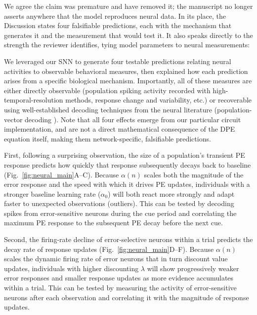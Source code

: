 We agree the claim was premature and have removed it; the manuscript no longer asserts anywhere that the model reproduces neural data. In its place, the Discussion states four falsifiable predictions, each with the mechanism that generates it and the measurement that would test it. It also speaks directly to the strength the reviewer identifies, tying model parameters to neural measurements:

\begin{ms}
We leveraged our SNN to generate four testable predictions relating neural activities to observable behavioral measures, then explained how each prediction arises from a specific biological mechanism. Importantly, all of these measures are either directly observable (population spiking activity recorded with high-temporal-resolution methods, response change and variability, etc.) or recoverable using well-established decoding techniques from the neural literature (population-vector decoding \citep{georgopoulos1986neuronal, wu2006bayesian}). Note that all four effects emerge from our particular circuit implementation, and are not a direct mathematical consequence of the DPE equation itself, making them network-specific, falsifiable predictions.

First, following a surprising observation, the size of a population's transient PE response predicts how quickly that response subsequently decays back to baseline (Fig.~\ref{fig:neural_main}A--C). Because $\alpha(n)$ scales both the magnitude of the error response and the speed with which it drives PE updates, individuals with a stronger baseline learning rate ($\alpha_0$) will both react more strongly and adapt faster to unexpected observations (outliers). This can be tested by decoding spikes from error-sensitive neurons during the cue period and correlating the maximum PE response to the subsequent PE decay before the next cue.

Second, the firing-rate decline of error-selective neurons within a trial predicts the decay rate of response updates (Fig.~\ref{fig:neural_main}D--F). Because $\alpha(n)$ scales the dynamic firing rate of error neurons that in turn discount value updates, individuals with higher discounting $\lambda$ will show progressively weaker error responses and smaller response updates as more evidence accumulates within a trial. This can be tested by measuring the activity of error-sensitive neurons after each observation and correlating it with the magnitude of response updates.


\end{ms}
